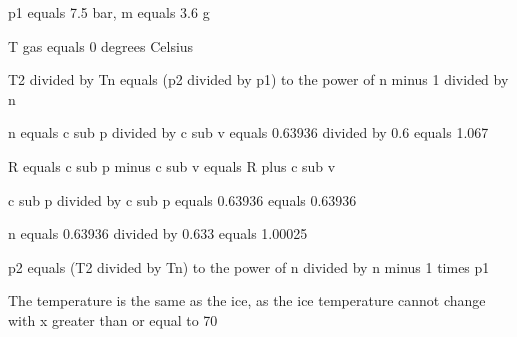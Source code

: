 p1 equals 7.5 bar, m equals 3.6 g

T gas equals 0 degrees Celsius

T2 divided by Tn equals (p2 divided by p1) to the power of n minus 1 divided by n

n equals c sub p divided by c sub v equals 0.63936 divided by 0.6 equals 1.067

R equals c sub p minus c sub v equals R plus c sub v

c sub p divided by c sub p equals 0.63936 equals 0.63936

n equals 0.63936 divided by 0.633 equals 1.00025

p2 equals (T2 divided by Tn) to the power of n divided by n minus 1 times p1

The temperature is the same as the ice, as the ice temperature cannot change with x greater than or equal to 70